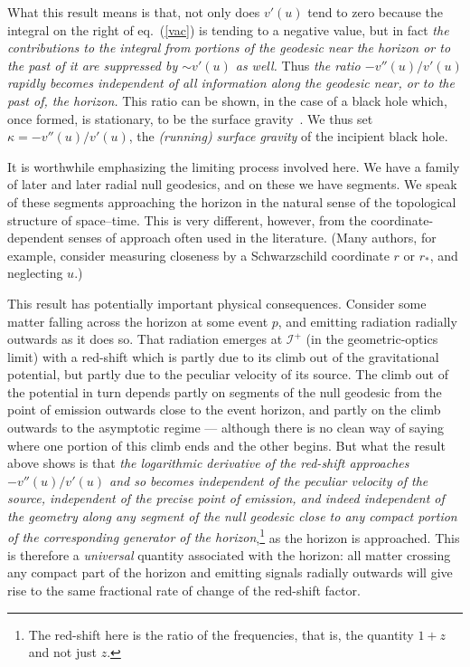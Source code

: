 \documentclass[12pt]{article}
\newcommand{\scrif}{{{\mathscr I}^{+}}}
\newcommand{\vv}{{v}}
\begin{document}
What this result means is that, not only does $\vv '(u)$ tend to zero because the integral on the right of eq.~(\ref{vac}) is tending to a negative value, but in fact {\em the contributions to the integral from portions of the geodesic near the horizon or to the past of it are suppressed by $\sim \vv' (u)$ as well.}  Thus {\em the ratio $-\vv ''(u) /\vv' (u)$ rapidly becomes independent of all information along the geodesic near, or to the past of, the horizon.}  This ratio can be shown, in the case of a black hole which, once formed, is stationary, to be the surface gravity~\citep{Helfer:2001}.  We thus set $\kappa =-\vv''(u)/\vv' (u)$, the {\em (running) surface gravity} of the incipient black hole.

It is worthwhile emphasizing the limiting process involved here.  We have a family of later and later radial null geodesics, and on these we have segments.  We speak of these segments approaching the horizon in the natural sense of the topological structure of space--time.  This is very different, however, from the 
coordinate-dependent senses of approach often used in the literature.  (Many authors, for example, consider measuring closeness by a Schwarzschild coordinate $r$ or $r_*$, and neglecting $u$.)  

This result has potentially important physical consequences.  Consider some matter falling across the horizon at some event $p$, and emitting radiation radially outwards as it does so.  That radiation emerges at $\scrif$ (in the geometric-optics limit) with a red-shift which is partly due to its climb out of the gravitational potential, but partly due to the peculiar velocity of its source. 
The climb out of the potential in turn depends partly on segments of the null geodesic from the point of emission outwards close to the event horizon, and partly on the climb outwards to the asymptotic regime --- although there is no clean way of saying where one portion of this climb ends and the other begins.  But
what the result above shows is that {\em the logarithmic derivative of the red-shift approaches
$-\vv ''(u)/\vv' (u)$ and so becomes independent of the peculiar velocity of the source, independent of the precise point of emission, and indeed independent of the geometry along any segment of the null geodesic close to any compact portion of the corresponding generator of the horizon},\footnote{The red-shift here is the ratio of the frequencies, that is, the quantity $1+z$ and not just $z$.}  as the horizon is approached.  This is therefore a {\em universal} quantity associated with the horizon:  all matter crossing any compact part of the horizon and emitting signals radially outwards will give rise to the same fractional rate of change of the red-shift factor.
\end{document}
